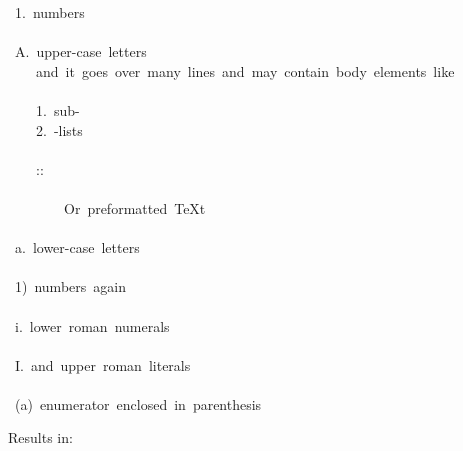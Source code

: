 \documentclass[12pt]{article}
\begin{document}
\begin{ttfamily}\begin{flushleft}
\mbox{~1.~numbers}\\
\mbox{}\\
\mbox{~A.~upper-case~letters}\\
\mbox{~~~~and~it~goes~over~many~lines~and~may~contain~body~elements~like}\\
\mbox{}\\
\mbox{~~~~1.~sub-}\\
\mbox{~~~~2.~-lists}\\
\mbox{}\\
\mbox{~~~~::}\\
\mbox{}\\
\mbox{~~~~~~~~Or~preformatted~\TeX{}t}\\
\mbox{}\\
\mbox{~a.~lower-case~letters}\\
\mbox{}\\
\mbox{~1)~numbers~again}\\
\mbox{}\\
\mbox{~i.~lower~roman~numerals}\\
\mbox{}\\
\mbox{~I.~and~upper~roman~literals}\\
\mbox{}\\
\mbox{~(a)~enumerator~enclosed~in~parenthesis}\\
\end{flushleft}\end{ttfamily}

Results in:
\end{document}
